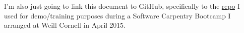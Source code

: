 I'm also just going to link this document to GitHub, specifically to the \href{https://github.com/dbouquin/2015-04-01-wcmc-git}{repo} I used for demo/training purposes during a Software Carpentry Bootcamp I arranged at Weill Cornell in April 2015.
    